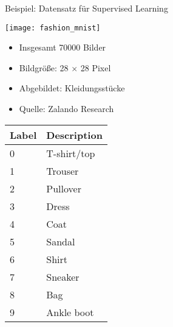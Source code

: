 \begin{frame}{Beispiel: Datensatz für Supervised Learning}
  \begin{minipage}{.6\textwidth}
    \centering \texttt{[image: fashion\_mnist]}
  \end{minipage}\hfill%
  \begin{minipage}{.4\textwidth}
    \begin{itemize}
    \item Insgesamt 70000 Bilder
    \item Bildgröße: 28 \(\times\) 28 Pixel
    \item Abgebildet: Kleidungsstücke 
    \item Quelle: Zalando Research \parencite{xiao2017fashion}
    \end{itemize}

    \vspace{.5cm}

    \tiny

    \centering
    \begin{tabular}{ll}
      \toprule
      \textbf{Label} & 	\textbf{Description}\\
      \midrule
      0 & 	T-shirt/top\\
      1 & 	Trouser\\
      2 & 	Pullover\\
      3 & 	Dress\\
      4 & 	Coat\\
      5 & 	Sandal\\
      6 & 	Shirt\\
      7 & 	Sneaker\\
      8 & 	Bag\\
      9 & 	Ankle boot\\
      \bottomrule
    \end{tabular}

  \end{minipage}

\end{frame}

